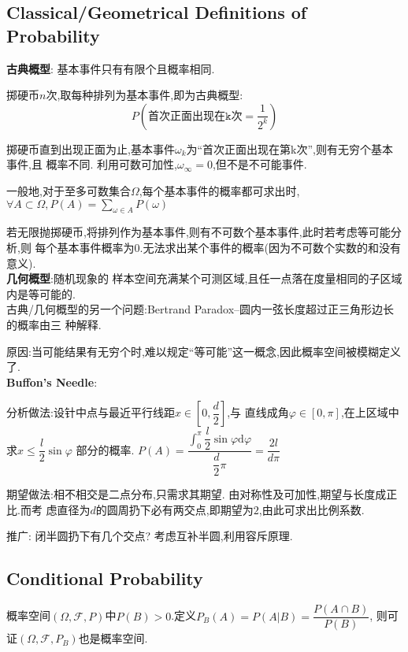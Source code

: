 \subsection{Classical/Geometrical Definitions of Probability}

{\bf 古典概型}: 基本事件只有有限个且概率相同.

掷硬币$ n$次,取每种排列为基本事件,即为古典概型:
\[  P(\texttt{首次正面出现在k次}=\dfrac{1}{2^k})\]

掷硬币直到出现正面为止,基本事件$ \omega_k$为``首次正面出现在第k次'',则有无穷个基本事件,且
概率不同.
利用可数可加性,$ \omega_{\infty} = 0$,但不是不可能事件.

一般地,对于至多可数集合$ \Omega$,每个基本事件的概率都可求出时,$ \forall A
\subset \Omega, P(A) = \sum_{\omega \in A}P(\omega)$

若无限抛掷硬币,将排列作为基本事件,则有不可数个基本事件,此时若考虑等可能分析,则
每个基本事件概率为0.无法求出某个事件的概率(因为不可数个实数的和没有意义).
\\

{\bf 几何概型}:随机现象的 样本空间充满某个可测区域,且任一点落在度量相同的子区域
内是等可能的.
\\

古典/几何概型的另一个问题:Bertrand Paradox--圆内一弦长度超过正三角形边长的概率由三
种解释.

原因:当可能结果有无穷个时,难以规定``等可能''这一概念,因此概率空间被模糊定义了.
\\

{\bf Buffon's Needle}:

分析做法:设针中点与最近平行线距$ x\in [0, \dfrac{d}{2}]$,与
直线成角$ \varphi\in[0,\pi]$,在上区域中求$ x \le \dfrac{l}{2}\sin{\varphi}$
部分的概率. $ P(A) =
\dfrac{\int_{0}^{\pi}{\dfrac{l}{2}\sin{\varphi}\mathrm{d}{\varphi}}}{\dfrac{d}{2}\pi}
= \dfrac{2l}{d\pi}$

期望做法:相不相交是二点分布,只需求其期望. 由对称性及可加性,期望与长度成正比.而考
虑直径为$ d$的圆周扔下必有两交点,即期望为$ 2$,由此可求出比例系数.

推广: 闭半圆扔下有几个交点? 考虑互补半圆,利用容斥原理.

\subsection{Conditional Probability}
概率空间$( \Omega, \mathcal{F}, P)$中$ P(B) > 0$.定义$ P_B(A) = P(A | B) = \dfrac{P(A\cap B)}{P(B)}$,
则可证$ (\Omega, \mathcal{F}, P_B)$也是概率空间.


